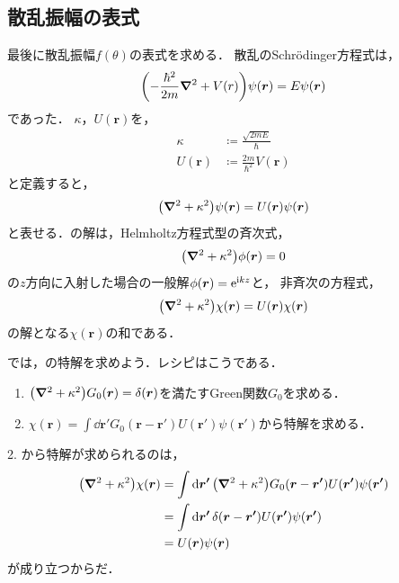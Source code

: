 \documentclass{report}
\begin{document}
  \subsection{散乱振幅の表式}
    最後に散乱振幅$f(\theta)$の表式を求める．
    散乱のSchrödinger方程式は，
    \begin{align}
      \qty(-\frac{\hbar^2}{2m}\grad^2 + V(r))\psi(\bm{r}) = E\psi(\bm{r})
    \end{align}
    であった．
    $\kappa$，$U(\bm{r})$を，
    \begin{align}
        \kappa &\coloneqq \frac{\sqrt{2mE}}{\hbar} \\
        U(\bm{r}) &\coloneqq \frac{2m}{\hbar^2} V(\bm{r})
    \end{align}
    と定義すると，
    \begin{align}
      \qty(\grad^2 + \kappa^2)\psi(\bm{r}) = U(\bm{r}) \psi(\bm{r}) \label{helmholtz-eq}
    \end{align}
    と表せる．の解は，Helmholtz方程式型の斉次式，
    \begin{align}
      \qty(\grad^2 + \kappa^2)\phi(\bm{r}) = 0
    \end{align}
    の$z$方向に入射した場合の一般解$\phi(\bm{r}) = \mathrm{e}^{\mathrm{i} kz}$と，
    非斉次の方程式，
    \begin{align}
      \qty(\grad^2 + \kappa^2)\chi(\bm{r}) = U(\bm{r}) \chi(\bm{r})\label{particular-solution}
    \end{align}
    の解となる$\chi(\bm{r})$の和である．
    \par
    では，の特解を求めよう．レシピはこうである．
    \begin{enumerate}
      \item $\qty(\grad^2 + \kappa^2)G_0(\bm{r}) = \delta(\bm{r})$を満たすGreen関数$G_0$を求める．
      \item $\chi(\bm{r}) = \int\dd{\bm{r'}} G_0(\bm{r} - \bm{r'}) U(\bm{r'}) \psi(\bm{r'})$から特解を求める．
    \end{enumerate}
    2. から特解が求められるのは，
    \begin{align}
      \qty(\grad^2 + \kappa^2)\chi(\bm{r}) &= \int \dd{\bm{r'}}\qty(\grad^2 + \kappa^2)G_0(\bm{r} - \bm{r'}) U(\bm{r'}) \psi(\bm{r'}) \\
      &= \int\dd{\bm{r'}} \delta(\bm{r} - \bm{r'}) U(\bm{r'}) \psi(\bm{r'}) \\
      &= U(\bm{r}) \psi(\bm{r})
    \end{align}
    が成り立つからだ．
\end{document}
